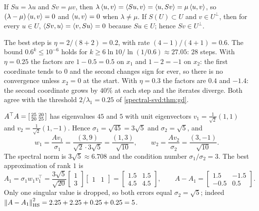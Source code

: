 If $Su = \lambda u$ and $Sv = \mu v$, then
$\lambda\left\langle u, v \right\rangle = \left\langle Su, v \right\rangle = \left\langle u, Sv \right\rangle = \mu\left\langle u, v \right\rangle$, so
$(\lambda - \mu)\left\langle u, v \right\rangle = 0$ and $\left\langle u, v \right\rangle = 0$ when
$\lambda\neq\mu$. If $S(U)\subset U$ and $v\in U^\perp$, then for every
$u\in U$, $\left\langle Sv, u \right\rangle = \left\langle v, Su \right\rangle = 0$ because $Su\in U$; hence
$Sv\in U^\perp$.

The best step is $\eta = 2/(8 + 2) = 0.2$, with rate
$(4 - 1)/(4 + 1) = 0.6$. The bound $0.6^k\leq10^{-6}$ holds for
$k\geq6\ln10/\ln(1/0.6)\approx27.05$: $28$ steps. With $\eta = 0.25$ the
factors are $1 - 0.5 = 0.5$ on $x_1$ and $1 - 2 = -1$ on $x_2$: the first
coordinate tends to $0$ and the second changes sign for ever, so there is
no convergence unless $x_2 = 0$ at the start. With $\eta = 0.3$ the
factors are $0.4$ and $-1.4$: the second coordinate grows by $40\%$ at
each step and the iterates diverge. Both agree with the threshold
$2/\lambda_1 = 0.25$ of \cref{spectral-svd:thm:gd}.

$A^\top A = \begin{bsmallmatrix}25 & 20\\20 & 25\end{bsmallmatrix}$ has
eigenvalues $45$ and $5$ with unit eigenvectors
$v_1 = \frac1{\sqrt2}(1, 1)$ and $v_2 = \frac1{\sqrt2}(1, -1)$. Hence
$\sigma_1 = \sqrt{45} = 3\sqrt5$ and $\sigma_2 = \sqrt5$, and
\[
  w_1 = \frac{Av_1}{\sigma_1} = \frac{(3, 9)}{\sqrt2\cdot3\sqrt5}
  = \frac{(1, 3)}{\sqrt{10}} ,
  \qquad
  w_2 = \frac{Av_2}{\sigma_2} = \frac{(3, -1)}{\sqrt{10}} .
\]
The spectral norm is $3\sqrt5\approx6.708$ and the condition number
$\sigma_1/\sigma_2 = 3$. The best approximation of rank $1$ is
\[
  A_1 = \sigma_1w_1v_1^\top
  = \frac{3\sqrt5}{\sqrt{20}}
    \begin{bmatrix}1\\3\end{bmatrix}\begin{bmatrix}1 & 1\end{bmatrix}
  = \begin{bmatrix}1.5 & 1.5\\4.5 & 4.5\end{bmatrix} ,
  \qquad
  A - A_1 = \begin{bmatrix}1.5 & -1.5\\-0.5 & 0.5\end{bmatrix} .
\]
Only one singular value is dropped, so both errors equal
$\sigma_2 = \sqrt5$; indeed
$\left\|A - A_1\right\|_{\mathrm{HS}}^2 = 2.25 + 2.25 + 0.25 + 0.25 = 5$.

